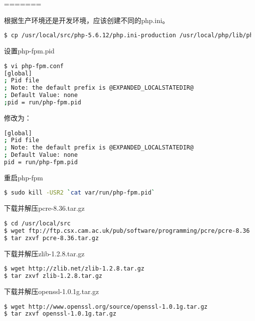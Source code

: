 \begin{lstlisting}[language=bash]

\end{lstlisting}



=======


根据生产环境还是开发环境，应该创建不同的php.ini。

\begin{lstlisting}[language=bash]
$ cp /usr/local/src/php-5.6.12/php.ini-production /usr/local/php/lib/php.ini
\end{lstlisting}

设置php-fpm.pid

\begin{lstlisting}[language=bash]
$ vi php-fpm.conf
[global]
; Pid file
; Note: the default prefix is @EXPANDED_LOCALSTATEDIR@
; Default Value: none
;pid = run/php-fpm.pid
\end{lstlisting}

修改为：

\begin{lstlisting}[language=bash]
[global]
; Pid file
; Note: the default prefix is @EXPANDED_LOCALSTATEDIR@
; Default Value: none
pid = run/php-fpm.pid
\end{lstlisting}

重启php-fpm


\begin{lstlisting}[language=bash]
$ sudo kill -USR2 `cat var/run/php-fpm.pid`
\end{lstlisting}



下载并解压pcre-8.36.tar.gz

\begin{lstlisting}[language=bash]
$ cd /usr/local/src
$ wget ftp://ftp.csx.cam.ac.uk/pub/software/programming/pcre/pcre-8.36.tar.gz
$ tar zxvf pcre-8.36.tar.gz
\end{lstlisting}


下载并解压zlib-1.2.8.tar.gz


\begin{lstlisting}[language=bash]
$ wget http://zlib.net/zlib-1.2.8.tar.gz
$ tar zxvf zlib-1.2.8.tar.gz
\end{lstlisting}

下载并解压openssl-1.0.1g.tar.gz


\begin{lstlisting}[language=bash]
$ wget http://www.openssl.org/source/openssl-1.0.1g.tar.gz
$ tar zxvf openssl-1.0.1g.tar.gz
\end{lstlisting}

